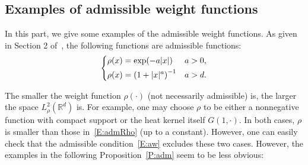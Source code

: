 \documentclass[a4paper,11pt]{article}%
\theoremstyle{plain}
\theoremstyle{definition}
\numberwithin{equation}{section}
\newcommand{\R}{\mathbb{R}}
\begin{document}
\subsection{Examples of admissible weight functions}\label{SS:Weight}

In this part, we give some examples of the admissible weight functions. As given in Section 2
of~\cite{tessitore.zabczyk:98:invariant}, the following functions are admissible functions:
\begin{equation}\label{E:admRho}
\begin{dcases}
  \rho(x) = \exp(-a|x|)               & a>0, \\
  \rho(x) = \left(1+|x|^a\right)^{-1} & a>d.
\end{dcases}
\end{equation}

The smaller the weight function $\rho(\cdot)$ (not necessarily admissible) is, the larger the space
$L_\rho^2(\R^d)$ is. For example, one may choose $\rho$ to be either a nonnegative function with
compact support or the heat kernel itself $G(1,\cdot)$. In both cases, $\rho$ is smaller than those
in~\eqref{E:admRho} (up to a constant). However, one can easily check that the admissible
condition~\eqref{E:aw} excludes these two cases. However, the examples in the following
Proposition~\ref{P:adm} seem to be less obvious:
\end{document}
